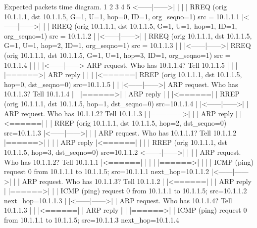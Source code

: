 \begin{DoxyVerb} Expected packets time diagram.
           1       2       3       4       5
    <------|------>|       |       |       |        RREQ (orig 10.1.1.1, dst 10.1.1.5, G=1, U=1, hop=0, ID=1, org_seqno=1) src = 10.1.1.1
           |<------|------>|       |       |        RREQ (orig 10.1.1.1, dst 10.1.1.5, G=1, U=1, hop=1, ID=1, org_seqno=1) src = 10.1.1.2
           |       |<------|------>|       |        RREQ (orig 10.1.1.1, dst 10.1.1.5, G=1, U=1, hop=2, ID=1, org_seqno=1) src = 10.1.1.3
           |       |       |<------|------>|        RREQ (orig 10.1.1.1, dst 10.1.1.5, G=1, U=1, hop=3, ID=1, org_seqno=1) src = 10.1.1.4
           |       |       |       |<------|------> ARP request. Who has 10.1.1.4? Tell 10.1.1.5
           |       |       |       |======>|        ARP reply
           |       |       |       |<======|        RREP (orig 10.1.1.1, dst 10.1.1.5, hop=0, dst_seqno=0) src=10.1.1.5
           |       |       |<------|------>|        ARP request. Who has 10.1.1.3? Tell 10.1.1.4
           |       |       |======>|       |        ARP reply
           |       |       |<======|       |        RREP (orig 10.1.1.1, dst 10.1.1.5, hop=1, dst_seqno=0) src=10.1.1.4
           |       |<------|------>|       |        ARP request. Who has 10.1.1.2? Tell 10.1.1.3
           |       |======>|       |       |        ARP reply
           |       |<======|       |       |        RREP (orig 10.1.1.1, dst 10.1.1.5, hop=2, dst_seqno=0) src=10.1.1.3
           |<------|------>|       |       |        ARP request. Who has 10.1.1.1? Tell 10.1.1.2
           |======>|       |       |       |        ARP reply
           |<======|       |       |       |        RREP (orig 10.1.1.1, dst 10.1.1.5, hop=3, dst_seqno=0) src=10.1.1.2
   <-------|------>|       |       |       |        ARP request. Who has 10.1.1.2? Tell 10.1.1.1
           |<======|       |       |       |
           |======>|       |       |       |        ICMP (ping) request 0 from 10.1.1.1 to 10.1.1.5; src=10.1.1.1 next_hop=10.1.1.2
           |<------|------>|       |       |        ARP request. Who has 10.1.1.3? Tell 10.1.1.2
           |       |<======|       |       |        ARP reply
           |       |======>|       |       |        ICMP (ping) request 0 from 10.1.1.1 to 10.1.1.5; src=10.1.1.2 next_hop=10.1.1.3
           |       |<------|------>|       |        ARP request. Who has 10.1.1.4? Tell 10.1.1.3
           |       |       |<======|       |        ARP reply
           |       |       |======>|       |        ICMP (ping) request 0 from 10.1.1.1 to 10.1.1.5; src=10.1.1.3 next_hop=10.1.1.4

\end{DoxyVerb}
